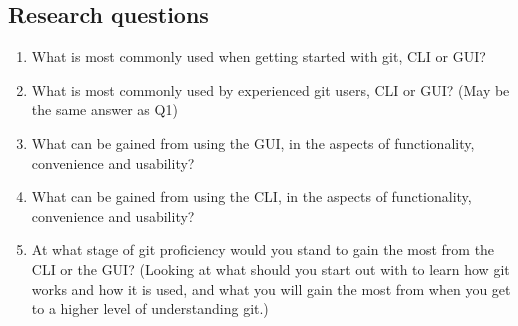 \documentclass[12pt,a4paper,article,compsoc]{IEEEtran}
\begin{document}
			\subsection{Research questions}
			\begin{enumerate}
				\item What is most commonly used when getting started with git, CLI or GUI?
				\item What is most commonly used by experienced git users, CLI or GUI? (May be the same answer as Q1)
				\item What can be gained from using the GUI, in the aspects of functionality, convenience and usability?
				\item What can be gained from using the CLI, in the aspects of functionality, convenience and usability?
				\item At what stage of git proficiency would you stand to gain the most from the CLI or the GUI? (Looking at what should you start out with to learn how git works and how it is used, and what you will gain the most from when you get to a higher level of understanding git.)
			\end{enumerate}
		
\end{document}
